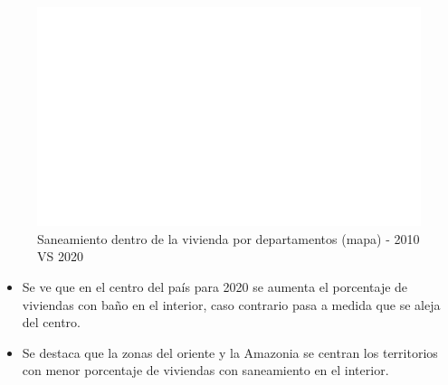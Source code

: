     \begin{figure}[H]
        \caption{Saneamiento dentro de la vivienda por departamentos (mapa) - 2010 VS 2020 \label{map_result_2} }
        \begin{center}
        \includegraphics[width=\textwidth,keepaspectratio]{img/var_193_map.png}
        \end{center}
    \end{figure}
            \begin{itemize}
                    \item Se ve que en el centro del país para 2020 se aumenta el porcentaje de viviendas con baño en el interior, caso contrario pasa a medida que se aleja del centro. 
                    \item Se destaca que la zonas del oriente y la Amazonia se centran los territorios con menor porcentaje de viviendas con saneamiento en el interior.
                    \end{itemize}

